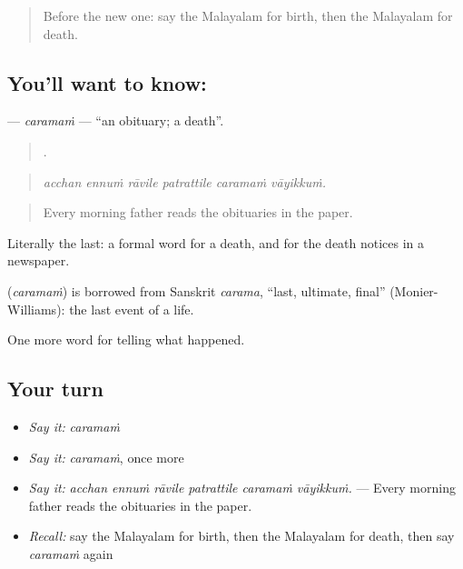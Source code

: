 \label{lesson:ML-C384-caramam}



\begin{quote}
Before the new one: say the Malayalam for birth, then the Malayalam for death.
\end{quote}

\subsection*{You'll want to know: }
\textbf{} — \emph{caramaṁ} — \textquotedblleft{}an obituary; a death\textquotedblright{}.

\begin{quote}
     .
\end{quote}

\begin{quote}
\emph{acchan ennuṁ rāvile patrattile caramaṁ vāyikkuṁ.}
\end{quote}

\begin{quote}
Every morning father reads the obituaries in the paper.
\end{quote}

Literally the last: a formal word for a death, and for the death notices in a newspaper.

\begin{cousinweb}
\textbf{} (\emph{caramaṁ}) is borrowed from Sanskrit \emph{carama}, \textquotedblleft{}last, ultimate, final\textquotedblright{} (Monier-Williams): the last event of a life.
\end{cousinweb}

\begin{grammarlens}[title={What you've built}]
One more word for telling what happened.
\end{grammarlens}

\subsection*{Your turn}
\begin{itemize}
\raggedright
  \item \emph{Say it:} \emph{caramaṁ}
  \item \emph{Say it:} \emph{caramaṁ}, once more
  \item \emph{Say it:} \emph{acchan ennuṁ rāvile patrattile caramaṁ vāyikkuṁ.} — Every morning father reads the obituaries in the paper.
  \item \emph{Recall:} say the Malayalam for birth, then the Malayalam for death, then say \emph{caramaṁ} again
\end{itemize}

